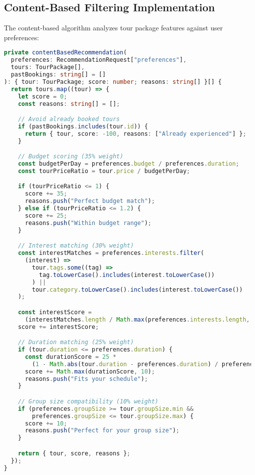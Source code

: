 \documentclass[12pt,a4paper]{article}
\begin{document}
\subsection{Content-Based Filtering Implementation}
The content-based algorithm analyzes tour package features against user preferences:

\begin{lstlisting}[language=typescript, caption=Content-Based Filtering Algorithm]
private contentBasedRecommendation(
  preferences: RecommendationRequest["preferences"],
  tours: TourPackage[],
  pastBookings: string[] = []
): { tour: TourPackage; score: number; reasons: string[] }[] {
  return tours.map((tour) => {
    let score = 0;
    const reasons: string[] = [];

    // Avoid already booked tours
    if (pastBookings.includes(tour.id)) {
      return { tour, score: -100, reasons: ["Already experienced"] };
    }

    // Budget scoring (35% weight)
    const budgetPerDay = preferences.budget / preferences.duration;
    const tourPriceRatio = tour.price / budgetPerDay;

    if (tourPriceRatio <= 1) {
      score += 35;
      reasons.push("Perfect budget match");
    } else if (tourPriceRatio <= 1.2) {
      score += 25;
      reasons.push("Within budget range");
    }

    // Interest matching (30% weight)
    const interestMatches = preferences.interests.filter(
      (interest) =>
        tour.tags.some((tag) => 
          tag.toLowerCase().includes(interest.toLowerCase())
        ) ||
        tour.category.toLowerCase().includes(interest.toLowerCase())
    );

    const interestScore = 
      (interestMatches.length / Math.max(preferences.interests.length, 1)) * 30;
    score += interestScore;

    // Duration matching (25% weight)
    if (tour.duration <= preferences.duration) {
      const durationScore = 25 * 
        (1 - Math.abs(tour.duration - preferences.duration) / preferences.duration);
      score += Math.max(durationScore, 10);
      reasons.push("Fits your schedule");
    }

    // Group size compatibility (10% weight)
    if (preferences.groupSize >= tour.groupSize.min && 
        preferences.groupSize <= tour.groupSize.max) {
      score += 10;
      reasons.push("Perfect for your group size");
    }

    return { tour, score, reasons };
  });
}
\end{lstlisting}
\end{document}
